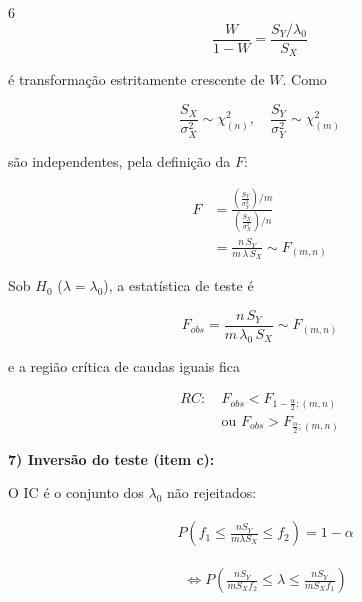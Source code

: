 \documentclass[8pt, a4paper, landscape]{extarticle}
\begin{document}
\begin{multicols}{6}
\begin{equation*}
\frac{W}{1-W} = \frac{S_Y/\lambda_0}{S_X}
\end{equation*}

é transformação estritamente crescente de $W$. Como

\begin{equation*}
\frac{S_X}{\sigma_X^2} \sim \chi^2_{(n)}, \quad \frac{S_Y}{\sigma_Y^2} \sim \chi^2_{(m)}
\end{equation*}

são independentes, pela definição da $F$:

\begin{equation*}
\begin{split}
F &= \frac{\left(\frac{S_Y}{\sigma_Y^2}\right)/m}{\left(\frac{S_X}{\sigma_X^2}\right)/n} \\
&= \frac{n\,S_Y}{m\,\lambda\,S_X} \sim F_{(m,n)}
\end{split}
\end{equation*}

Sob $H_0$ ($\lambda = \lambda_0$), a estatística de teste é

\begin{equation*}
F_{obs} = \frac{n\,S_Y}{m\,\lambda_0\,S_X} \sim F_{(m,n)}
\end{equation*}

e a região crítica de caudas iguais fica

\begin{equation*}
\begin{split}
RC: \ &F_{obs} < F_{1-\frac{\alpha}{2};(m,n)} \\
&\text{ou } F_{obs} > F_{\frac{\alpha}{2};(m,n)}
\end{split}
\end{equation*}

\vspace{0.2cm}

\textbf{7) Inversão do teste (item c):}

O IC é o conjunto dos $\lambda_0$ não rejeitados:

\begin{equation*}
\begin{split}
&P\left(f_1 \leq \frac{nS_Y}{m\lambda S_X} \leq f_2\right) = 1-\alpha
\end{split}
\end{equation*}

\begin{equation*}
\begin{split}
&\Leftrightarrow P\left(\frac{nS_Y}{mS_Xf_2} \leq \lambda \leq \frac{nS_Y}{mS_Xf_1}\right)
\end{split}
\end{equation*}


\end{multicols}
\end{document}
